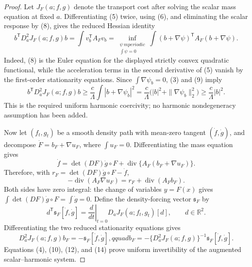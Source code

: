 \documentclass{article}
\begin{document}
\begin{proof}
Let \(J_F(a;f,g)\) denote the transport cost after solving the scalar mass equation at fixed \(a\).  Differentiating (5) twice, using (6), and eliminating the scalar response by (8), gives the reduced Hessian identity
\[
 b^{\mathsf T}D_a^2J_F(a;f,g)b
 =\int v_b^{\mathsf T}A_Fv_b
 =\inf_{\substack{\psi\ {
m periodic}\\ \int\psi=0}}
   \int(b+\nabla\psi)^{\mathsf T}A_F(b+\nabla\psi).                   \tag{9}
\]
Indeed, (8) is the Euler equation for the displayed strictly convex quadratic functional, while the acceleration terms in the second derivative of (5) vanish by the first-order stationarity equations.  Since \(\int\nabla\psi_b=0\), (3) and (9) imply
\[
 b^{\mathsf T}D_a^2J_F(a;f,g)b
 \geq\frac c\Lambda\int|b+\nabla\psi_b|^2
 =\frac c\Lambda\bigl(|b|^2+\|\nabla\psi_b\|_2^2\bigr)
 \geq\frac c\Lambda|b|^2.                                             \tag{10}
\]
This is the required uniform harmonic coercivity; no harmonic nondegeneracy assumption has been added.

Now let \((f_t,g_t)\) be a smooth density path with mean-zero tangent \((\dot f,\dot g)\), and decompose
\(\dot F=b_F+\nabla u_F\), where \(\int u_F=0\).  Differentiating the mass equation gives
\[
 \dot f=\det(DF)\dot g\circ F
       +\operatorname{div}\{A_F(b_F+\nabla u_F)\}.                     \tag{11}
\]
Therefore, with \(r_F=\det(DF)\dot g\circ F-\dot f\),
\[
 -\operatorname{div}(A_F\nabla u_F)
 =r_F+\operatorname{div}(A_Fb_F).                                     \tag{12}
\]
Both sides have zero integral: the change of variables \(y=F(x)\) gives \(\int\det(DF)\dot g\circ F=\int\dot g=0\).  Define the density-forcing vector \(\mathfrak s_F\) by
\[
 d^{\mathsf T}\mathfrak s_F[\dot f,\dot g]
 =\left.\frac d{dt}\right|_{t=0}D_aJ_F(a;f_t,g_t)[d],
 \qquad d\in\mathbb R^2.                                               \tag{13}
\]
Differentiating the two reduced stationarity equations gives
\[
 D_a^2J_F(a;f,g)b_F=-\mathfrak s_F[\dot f,\dot g],qquad
 b_F=-\{D_a^2J_F(a;f,g)\}^{-1}\mathfrak s_F[\dot f,\dot g].           \tag{14}
\]
Equations (4), (10), (12), and (14) prove uniform invertibility of the augmented scalar--harmonic system.


\end{proof}
\end{document}
